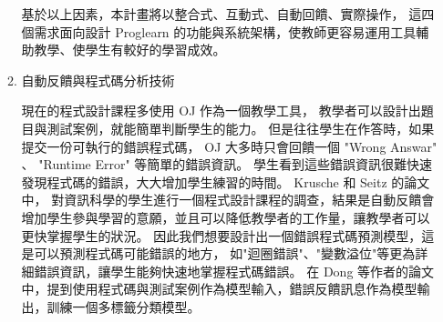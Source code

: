 \documentclass[12pt]{article}
\begin{document}
\begin{enumerate}
\begin{enumerate}
        \par 基於以上因素，本計畫將以整合式、互動式、自動回饋、實際操作，
        這四個需求面向設計 Proglearn 的功能與系統架構，使教師更容易運用工具輔助教學、使學生有較好的學習成效。

      \item 自動反饋與程式碼分析技術
        \par 現在的程式設計課程多使用 OJ 作為一個教學工具，
        教學者可以設計出題目與測試案例，就能簡單判斷學生的能力。
        但是往往學生在作答時，如果提交一份可執行的錯誤程式碼， OJ 大多時只會回饋一個 "Wrong Answar" 、 "Runtime Error" 等簡單的錯誤資訊。
        學生看到這些錯誤資訊很難快速發現程式碼的錯誤，大大增加學生練習的時間。 Krusche 和 Seitz 的論文\cite{ref16}中，
        對資訊科學的學生進行一個程式設計課程的調查，結果是自動反饋會增加學生參與學習的意願，並且可以降低教學者的工作量，讓教學者可以更快掌握學生的狀況。
        因此我們想要設計出一個錯誤程式碼預測模型，這是可以預測程式碼可能錯誤的地方，
        如"迴圈錯誤"、"變數溢位"等更為詳細錯誤資訊，讓學生能夠快速地掌握程式碼錯誤。
        在 Dong 等作者的論文\cite{ref17}中，提到使用程式碼與測試案例作為模型輸入，錯誤反饋訊息作為模型輸出，訓練一個多標籤分類模型。
    \end{enumerate}


\end{enumerate}
\end{document}
